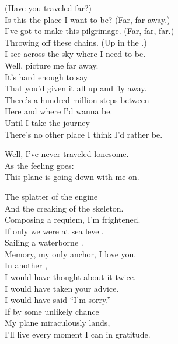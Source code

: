 
(Have you traveled far?) \\
Is this the place I want to be? (Far, far away.) \\
I've got to make this pilgrimage. (Far, far, far.) \\
Throwing off these chains. (Up in the .) \\
I see across the sky where I need to be. \\

Well, picture me far away. \\
It's hard enough to say \\
That you'd given it all up and fly away. \\
There's a hundred million steps between \\
Here and where I'd wanna be. \\
Until I take the journey \\
There's no other place I think I'd rather be. \\


Well, I've never traveled lonesome. \\
As the feeling goes: \\
This plane is going down with me on. \\


The splatter of the engine \\
And the creaking of the skeleton. \\
Composing a requiem, I'm frightened. \\
If only we were at sea level. \\
Sailing a waterborne . \\
Memory, my only anchor, I love you. \\

In another , \\
I would have thought about it twice. \\
I would have taken your advice. \\
I would have said ``I'm sorry.'' \\
If by some unlikely chance \\
My plane miraculously lands, \\
I'll live every moment I can in gratitude. \\



